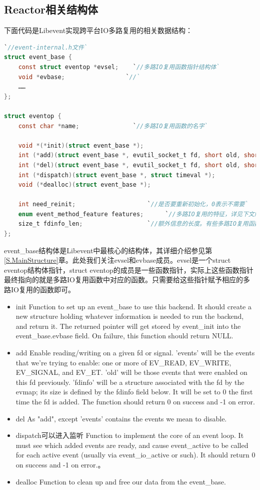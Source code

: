 \documentclass[11pt,a4paper]{article}
\begin{document}
\subsection{Reactor相关结构体}
下面代码是Libevent实现跨平台IO多路复用的相关数据结构：
\begin{lstlisting}[language=C]
`//event-internal.h文件`
struct event_base {  
	const struct eventop *evsel;	`//多路IO复用函数指针结构体`
	void *evbase;				  `//`
	……	
};

struct eventop {
	const char *name;				`//多路IO复用函数的名字`

	void *(*init)(struct event_base *);
	int (*add)(struct event_base *, evutil_socket_t fd, short old, short events, void *fdinfo);
	int (*del)(struct event_base *, evutil_socket_t fd, short old, short events, void *fdinfo);
	int (*dispatch)(struct event_base *, struct timeval *);
	void (*dealloc)(struct event_base *);

	int need_reinit;  					`//是否要重新初始化，0表示不需要`
	enum event_method_feature features;      `//多路IO复用的特征，详见下文解释`
	size_t fdinfo_len;					`//额外信息的长度。有些多路IO复用函数需要额外的信息`
};
\end{lstlisting}
event\_base结构体是Libevent中最核心的结构体，其详细介绍参见第\ref{S.MainStructure}章。此处我们关注evsel和evbase成员。evsel是一个struct eventop结构体指针，struct eventop的成员是一些函数指针，实际上这些函数指针最终指向的就是多路IO复用函数中对应的函数。只需要给这些指针赋予相应的多路IO复用的函数即可。
\begin{itemize}
\item init {Function to set up an event\_base to use this backend.  It should create a new structure holding whatever information is needed to run the backend, and return it.  The returned pointer will get stored by event\_init into the event\_base.evbase field.  On failure, this function should return NULL. }
\item add {Enable reading/writing on a given fd or signal.  'events' will be the events that we're trying to enable: one or more of EV\_READ, EV\_WRITE, EV\_SIGNAL, and EV\_ET.  'old' will be those events that were enabled on this fd previously.  'fdinfo' will be a structure associated with the fd by the evmap; its size is defined by the fdinfo field below.  It will be set to 0 the first time the fd is added.  The function should return 0 on success and -1 on error.}
\item del { As "add", except 'events' contains the events we mean to disable.}
\item dispatch可以进入监听 {Function to implement the core of an event loop.  It must see which added events are ready, and cause event\_active to be called for each active event (usually via event\_io\_active or such).  It should return 0 on success and -1 on error.}。
\item dealloc {Function to clean up and free our data from the event\_base.}
\end{itemize}
\end{document}
